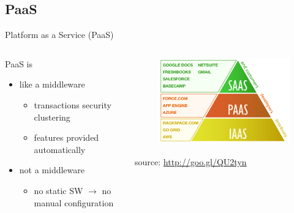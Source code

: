 \subsection{PaaS}
\begin{frame}{Platform as a Service \footnotesize{(PaaS)}}
	\only<1>
	{
		\begin{columns}
			\begin{column}{0.55\textwidth}
				PaaS is
				\begin{itemize}
					\item{\footnotesize{like a middleware}}
					\begin{itemize}
						\item{\scriptsize{transactions security clustering}}
						\item{\scriptsize{features provided automatically}}
					\end{itemize}
					\item{\footnotesize{not a middleware}}
					\begin{itemize}
						\item{\scriptsize{no static SW $\rightarrow{}$ no manual configuration}}
					\end{itemize}
				\end{itemize}
			\end{column}
			\begin{column}{0.45\textwidth}
				\begin{figure}
					\centering{}
					\includegraphics[scale=0.33]{images/cloud-service-models.png}
				\end{figure}
				\begin{flushright}
					\tiny{source: \url{http://goo.gl/QU2tyn}}
				\end{flushright}
			\end{column}
		\end{columns}
	}
	{
		\begin{figure}

\end{figure}}
\end{frame}
